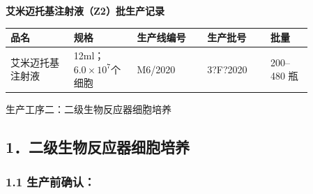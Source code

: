 \documentclass[UTF8,10pt,a4paper,fontset=fandol]{ctexart}
\newcommand{\fieldvalue}[1]{#1}
\newcommand{\handwritten}[1]{#1}
\begin{document}
\begin{center}
{\large \textbf{艾米迈托基注射液（Z2）批生产记录}}
\end{center}

\noindent
\begin{tabular}{|p{0.18\linewidth}|p{0.18\linewidth}|p{0.20\linewidth}|p{0.18\linewidth}|p{0.12\linewidth}|}
\hline
品名 & 规格 & 生产线编号 & 生产批号 & 批量 \\ \hline
艾米迈托基注射液 & 12ml；$6.0\times10^{7}$个细胞 &
\fieldvalue{\handwritten{M6/2020}} &
\fieldvalue{\handwritten{3?F?2020}} &
200--480 瓶 \\ \hline
\end{tabular}

\vspace{0.3em}

生产工序二：二级生物反应器细胞培养

\subsection*{1．二级生物反应器细胞培养}

\subsubsection*{1.1 生产前确认：}
\end{document}
